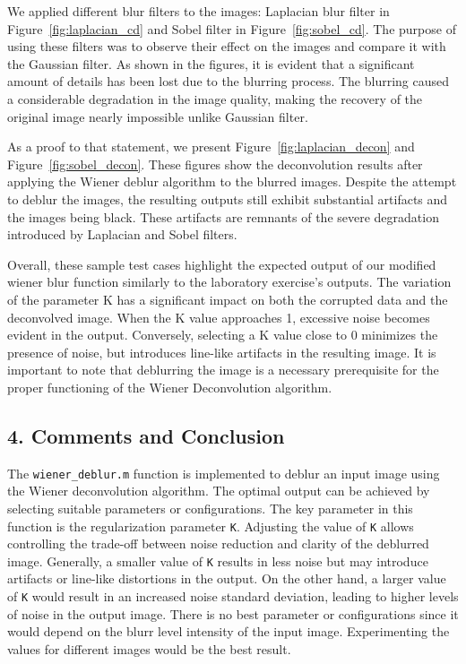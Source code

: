 \documentclass{article}
\begin{document}
\begin{itemize}
			We applied different blur filters to the images: Laplacian blur filter in Figure~\ref{fig:laplacian_cd} and Sobel filter in Figure~\ref{fig:sobel_cd}. 
			The purpose of using these filters was to observe their effect on the images and compare it with the Gaussian filter. As shown in the figures, it is evident that a 
			significant amount of details has been lost due to the blurring process. The blurring caused a considerable degradation in the image quality, making the recovery of the original 
			image nearly impossible unlike Gaussian filter.

			As a proof to that statement, we present Figure~\ref{fig:laplacian_decon} and Figure~\ref{fig:sobel_decon}. These figures show the deconvolution results after applying the 
			Wiener deblur algorithm to the blurred images. Despite the attempt to deblur the images, the resulting outputs still exhibit substantial artifacts and the images being black. 
			These artifacts are remnants of the severe degradation introduced by Laplacian and Sobel filters.

	\end{itemize}

	Overall, these sample test cases highlight the expected output of our modified wiener blur function similarly to the laboratory exercise's outputs. The variation of the parameter K has a 
	significant impact on both the corrupted data and the deconvolved image. When the K value approaches 1, excessive noise becomes evident in the output. Conversely, selecting a K value 
	close to 0 minimizes the presence of noise, but introduces line-like artifacts in the resulting image. It is important to note that deblurring the image is a necessary prerequisite for 
	the proper functioning of the Wiener Deconvolution algorithm.

	\clearpage





	\subsection*{4. Comments and Conclusion}
	The {\texttt{wiener\_deblur.m}} function is implemented to deblur an input image using the Wiener deconvolution algorithm. The optimal output can be achieved by selecting suitable parameters or 
	configurations. The key parameter in this function is the regularization parameter {\texttt{K}}. Adjusting the value of {\texttt{K}} allows controlling the trade-off between noise reduction 
	and clarity of the deblurred image. Generally, a smaller value of {\texttt{K}} results in less noise but may introduce artifacts or line-like distortions in the output. On the other hand, 
	a larger value of {\texttt{K}} would result in an increased noise standard deviation, leading to higher levels of noise in the output image. There is no best parameter or configurations since
	it would depend on the blurr level intensity of the input image. Experimenting the values for different images would be the best result.
\end{document}
